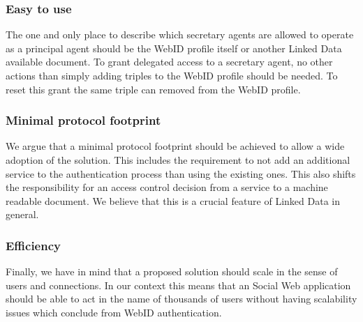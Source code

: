 \documentclass[a4paper]{llncs}
\begin{document}
\subsubsection{Easy to use}
The one and only place to describe which secretary agents are allowed to operate as a principal agent should be the WebID profile itself or another Linked Data available document.
To grant delegated access to a secretary agent, no other actions than simply adding triples to the WebID profile should be needed.
To reset this grant the same triple can removed from the WebID profile.


\subsubsection{Minimal protocol footprint}
We argue that a minimal protocol footprint should be achieved to allow a wide adoption of the solution.
This includes the requirement to not add an additional service to the authentication process than using the existing ones.
This also shifts the responsibility for an access control decision from a service to a machine readable document.
We believe that this is a crucial feature of Linked Data in general.

\subsubsection{Efficiency}
Finally, we have in mind that a proposed solution should scale in the sense of users and connections.
In our context this means that an Social Web application should be able to act in the name of thousands of users without having scalability issues which conclude from WebID authentication. 

 
\end{document}
